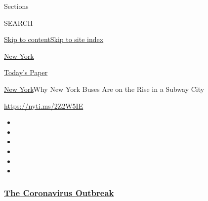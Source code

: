 Sections

SEARCH

\protect\hyperlink{site-content}{Skip to
content}\protect\hyperlink{site-index}{Skip to site index}

\href{https://www.nytimes3xbfgragh.onion/section/nyregion}{New York}

\href{https://myaccount.nytimes3xbfgragh.onion/auth/login?response_type=cookie\&client_id=vi}{}

\href{https://www.nytimes3xbfgragh.onion/section/todayspaper}{Today's
Paper}

\href{/section/nyregion}{New York}\textbar{}Why New York Buses Are on
the Rise in a Subway City

\url{https://nyti.ms/2Z2W5IE}

\begin{itemize}
\item
\item
\item
\item
\item
\item
\end{itemize}

\hypertarget{the-coronavirus-outbreak}{%
\subsubsection{\texorpdfstring{\href{https://www.nytimes3xbfgragh.onion/news-event/coronavirus?name=styln-coronavirus-national\&region=TOP_BANNER\&block=storyline_menu_recirc\&action=click\&pgtype=Article\&impression_id=4db92960-f4c0-11ea-8629-2f0d22bd94c8\&variant=undefined}{The
Coronavirus
Outbreak}}{The Coronavirus Outbreak}}\label{the-coronavirus-outbreak}}

